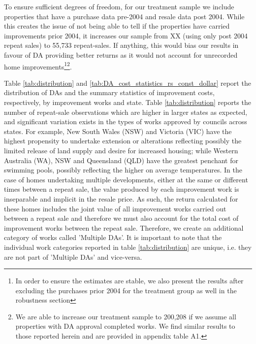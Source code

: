 \documentclass[AEJ,reqno, draftmode]{AEA} %
\begin{document}
To ensure sufficient degrees of freedom, for our treatment sample we include properties that have a purchase data pre-2004 and resale data post 2004. While this creates the issue of not being able to tell if the properties have carried improvements prior 2004, it increases our sample from XX (using only post 2004 repeat sales) to 55,733 repeat-sales. If anything, this would bias our results in favour of DA providing better returns as it would not account for unrecorded home improvements\footnote{In order to ensure the estimates are stable, we also present the results after excluding the purchases prior 2004 for the treatment group as well in the robustness section}\footnote{We are able to increase our treatment sample to 200,208 if we assume all properties with DA approval completed works. We find similar results to those reported herein and are provided in appendix table A1.}. 



%

Table \ref{tab:distribution} and \ref{tab:DA_cost_statistics_rs_const_dollar} report the distribution of DAs and the summary statistics of improvement costs, respectively,  by improvement works and state. Table \ref{tab:distribution} reports the number of repeat-sale observations which are higher in larger states as expected, and significant variation exists in the types of works approved by councils across states. For example, New South Wales (NSW) and Victoria (VIC) have the highest propensity to undertake extension or alterations reflecting possibly the limited release of land supply and desire for increased housing; while Western Australia (WA), NSW and Queensland (QLD) have the greatest penchant for swimming pools, possibly reflecting the higher on average temperatures. In the case of homes undertaking multiple developments, either at the same or different times between a repeat sale, the value produced by each improvement work is inseparable and implicit in the resale price. As such, the return calculated for these homes includes the joint value of all improvement works carried out between a repeat sale and therefore we must also account for the total cost of improvement works between the repeat sale. Therefore, we create an additional category of works called 'Multiple DAs'. It is important to note that the individual work categories reported in table \ref{tab:distribution} are unique, i.e. they are not part of 'Multiple DAs' and vice-versa.
\end{document}
